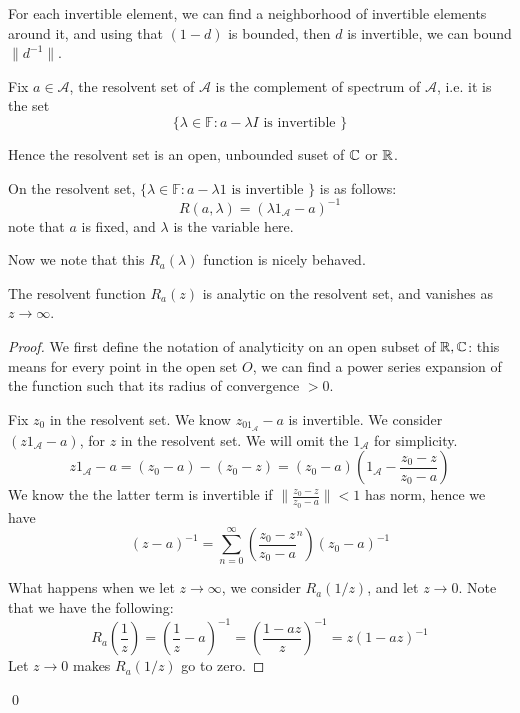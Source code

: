 \begin{remark}
    For each invertible element, we can find a neighborhood of invertible elements around it, and using that $(1-d)$ is bounded, then $d$ is invertible, we can bound $\|d^{-1}\|$.
\end{remark}

\begin{definition}
    Fix $a\in\mathcal{A}$, the resolvent set of $\mathcal{A}$ is the complement of spectrum of $\mathcal{A}$, i.e. it is the set
    \begin{equation*}
        \{\lambda\in\mathbb{F}: a-\lambda I \text{ is invertible } \}
    \end{equation*}
\end{definition}

Hence the resolvent set is an open, unbounded suset of $\mathbb{C}$ or $\mathbb{R}$.

\begin{definition}
    On the resolvent set, $\{\lambda\in\mathbb{F}: a-\lambda1 \text{ is invertible }\}$ is as follows:
    \begin{equation*}
        R(a,\lambda)=(\lambda1_\mathcal{A}-a)^{-1}
    \end{equation*}
    note that $a$ is fixed, and $\lambda$ is the variable here.
\end{definition}

Now we note that this $R_a(\lambda)$ function is nicely behaved.
\begin{proposition}
    The resolvent function $R_a(z)$ is analytic on the resolvent set, and vanishes as $z\to\infty$.
\end{proposition}
\begin{proof}
    We first define the notation of analyticity on an open subset of $\mathbb{R}, \mathbb{C}$: this means for every point in the open set $O$, we can find a power series expansion of the function such that its radius of convergence $>0$.

    Fix $z_0$ in the resolvent set. We know $z_01_\mathcal{A}-a$ is invertible. We consider $(z1_\mathcal{A}-a)$, for $z$ in the resolvent set. We will omit the $1_\mathcal{A}$ for simplicity.
    \begin{equation*}
        z1_\mathcal{A}-a=(z_0-a)-(z_0-z)=(z_0-a)\left(1_\mathcal{A}-\frac{z_0-z}{z_0-a}\right)
    \end{equation*}
    We know the the latter term is invertible if $\|\frac{z_0-z}{z_0-a}\|<1$ has norm, hence we have
    \begin{equation*}
        (z-a)^{-1}=\sum_{n=0}^\infty\left(\frac{z_0-z}{z_0-a}^n \right)(z_0-a)^{-1}
    \end{equation*}

    What happens when we let $z\to\infty$, we consider $R_a(1/z)$, and let $z\to 0$. Note that we have the following:
    \begin{equation*}
        R_a\left(\frac{1}{z}\right)=\left(\frac{1}{z}-a\right)^{-1}=\left(\frac{1-az}{z} \right)^{-1}=z(1-az)^{-1}
    \end{equation*}
    Let $z\to 0$ makes $R_a(1/z)$ go to zero.
\end{proof}
\qed

